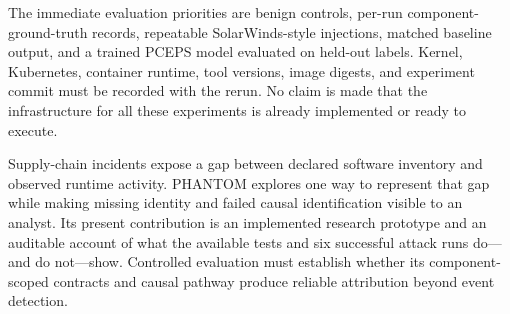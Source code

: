 \documentclass[conference]{IEEEtran}
\begin{document}
The immediate evaluation priorities are benign controls, per-run component-ground-truth records, repeatable SolarWinds-style injections, matched baseline output, and a trained PCEPS model evaluated on held-out labels. Kernel, Kubernetes, container runtime, tool versions, image digests, and experiment commit must be recorded with the rerun. No claim is made that the infrastructure for all these experiments is already implemented or ready to execute.

Supply-chain incidents expose a gap between declared software inventory and observed runtime activity. PHANTOM explores one way to represent that gap while making missing identity and failed causal identification visible to an analyst. Its present contribution is an implemented research prototype and an auditable account of what the available tests and six successful attack runs do—and do not—show. Controlled evaluation must establish whether its component-scoped contracts and causal pathway produce reliable attribution beyond event detection.
\end{document}
